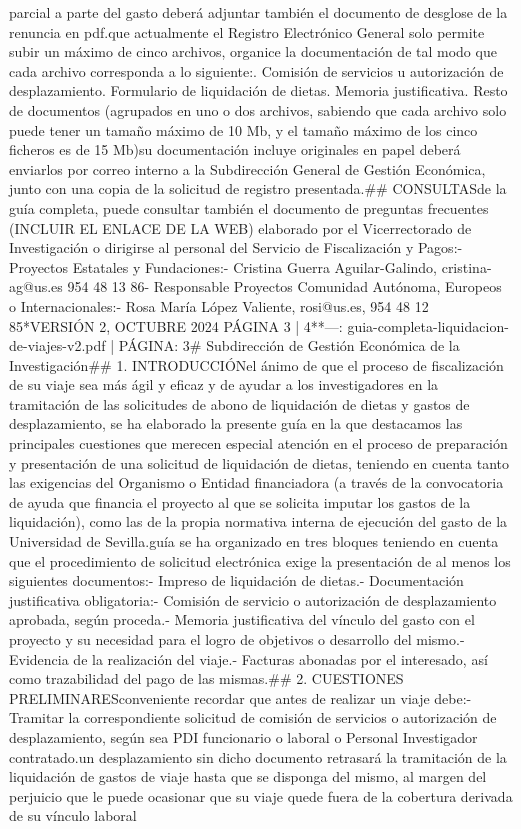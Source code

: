 \documentclass{article}
\begin{document}
\begin{itemize}
parcial a parte del gasto deberá adjuntar también el documento de desglose de la renuncia en pdf.\n\nDado que actualmente el Registro Electrónico General solo permite subir un máximo de cinco archivos, organice la documentación de tal modo que cada archivo corresponda a lo siguiente:\n{}. Comisión de servicios u autorización de desplazamiento. Formulario de liquidación de dietas. Memoria justificativa. Resto de documentos (agrupados en uno o dos archivos, sabiendo que cada archivo solo puede tener un tamaño máximo de 10 Mb, y el tamaño máximo de los cinco ficheros es de 15 Mb)\n\nSi su documentación incluye originales en papel deberá enviarlos por correo interno a la Subdirección General de Gestión Económica, junto con una copia de la solicitud de registro presentada.\n\n## CONSULTAS\n{} de la guía completa, puede consultar también el documento de preguntas frecuentes (INCLUIR EL ENLACE DE LA WEB) elaborado por el Vicerrectorado de Investigación o dirigirse al personal del Servicio de Fiscalización y Pagos:\n\n- Proyectos Estatales y Fundaciones:\n- Cristina Guerra Aguilar-Galindo, cristina-ag@us.es 954 48 13 86\n- Responsable Proyectos Comunidad Autónoma, Europeos o Internacionales:\n- Rosa María López Valiente, rosi@us.es, 954 48 12 85\n\n**VERSIÓN 2, OCTUBRE 2024        PÁGINA 3 | 4**\n\n---\n\nFUENTE: guia-completa-liquidacion-de-viajes-v2.pdf | PÁGINA: 3\n# Subdirección de Gestión Económica de la Investigación\n\n## 1. INTRODUCCIÓN\n\nCon el ánimo de que el proceso de fiscalización de su viaje sea más ágil y eficaz y de ayudar a los investigadores en la tramitación de las solicitudes de abono de liquidación de dietas y gastos de desplazamiento, se ha elaborado la presente guía en la que destacamos las principales cuestiones que merecen especial atención en el proceso de preparación y presentación de una solicitud de liquidación de dietas, teniendo en cuenta tanto las exigencias del Organismo o Entidad financiadora (a través de la convocatoria de ayuda que financia el proyecto al que se solicita imputar los gastos de la liquidación), como las de la propia normativa interna de ejecución del gasto de la Universidad de Sevilla.\n\nLa guía se ha organizado en tres bloques teniendo en cuenta que el procedimiento de solicitud electrónica exige la presentación de al menos los siguientes documentos:\n\n- Impreso de liquidación de dietas.\n- Documentación justificativa obligatoria:\n- Comisión de servicio o autorización de desplazamiento aprobada, según proceda.\n- Memoria justificativa del vínculo del gasto con el proyecto y su necesidad para el logro de objetivos o desarrollo del mismo.\n- Evidencia de la realización del viaje.\n- Facturas abonadas por el interesado, así como trazabilidad del pago de las mismas.\n\n## 2. CUESTIONES PRELIMINARES\n\nConsideramos conveniente recordar que antes de realizar un viaje debe:\n\n- Tramitar la correspondiente solicitud de comisión de servicios o autorización de desplazamiento, según sea PDI funcionario o laboral o Personal Investigador contratado.\n\nRealizar un desplazamiento sin dicho documento retrasará la tramitación de la liquidación de gastos de viaje hasta que se disponga del mismo, al margen del perjuicio que le puede ocasionar que su viaje quede fuera de la cobertura derivada de su vínculo laboral 
\end{itemize}
\end{document}
